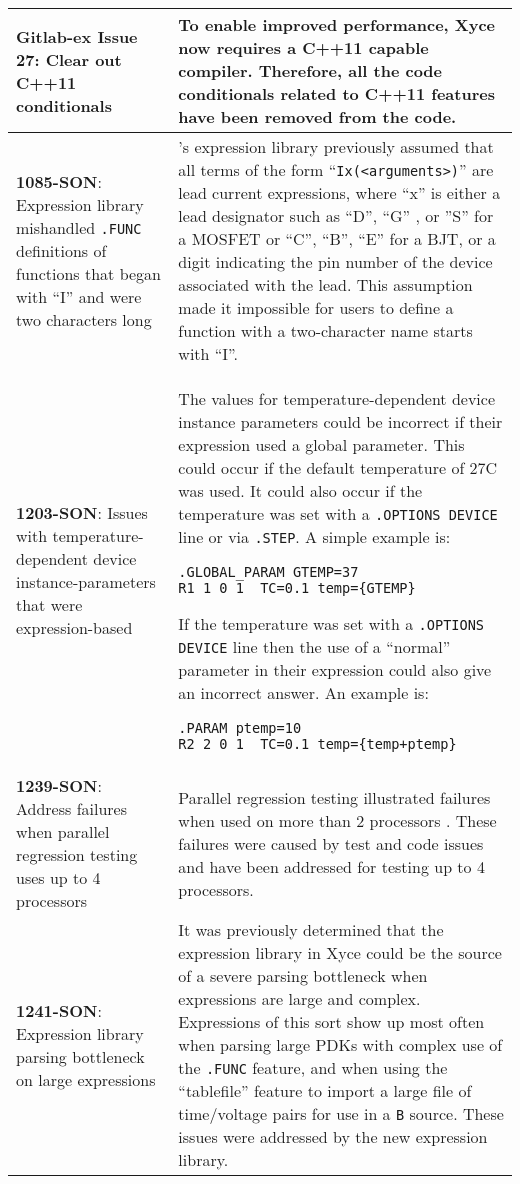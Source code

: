 {\begin{longtable}[h] {>{\raggedright\small}m{2in}|>{\raggedright\let\\\tabularnewline\small}m{3.5in}}
\textbf{Gitlab-ex Issue 27}:  Clear out C++11 conditionals&
To enable improved performance, Xyce now requires a C++11 capable
compiler.  Therefore, all the code conditionals related to C++11
features have been removed from the code.
\\ \hline

\textbf{1085-SON}: Expression library mishandled \texttt{.FUNC}
definitions of functions that began with ``I'' and were two characters
long &
\Xyce{}'s expression library previously assumed that all terms of the form
``\texttt{Ix(<arguments>)}'' are lead current expressions, where ``x'' is
either a lead designator such as ``D'', ``G'' , or ''S'' for a MOSFET
or ``C'', ``B'', ``E'' for a BJT, or a digit indicating the pin number
of the device associated with the lead.  This assumption made it
impossible for users to define a function with a two-character name
starts with ``I''.
\\ \hline

\textbf{1203-SON}: Issues with temperature-dependent device
instance-parameters that were expression-based & The values for
temperature-dependent device instance parameters could be incorrect
if their expression used a global parameter. This could occur if the
default temperature of 27C was used.  It could also occur if the
temperature was set with a \texttt{.OPTIONS DEVICE} line or via
\texttt{.STEP}.  A simple example is:
\begin{verbatim}
.GLOBAL_PARAM GTEMP=37
R1 1 0 1  TC=0.1 temp={GTEMP}
\end{verbatim}
If the temperature was set with a \texttt{.OPTIONS DEVICE} line then
the use of a ``normal'' parameter in their expression could also give
an incorrect answer.  An example is:
\begin{verbatim}
.PARAM ptemp=10
R2 2 0 1  TC=0.1 temp={temp+ptemp}
\end{verbatim}
\\ \hline

\textbf{1239-SON}: Address failures when parallel regression testing uses up to 4 processors &
Parallel regression testing illustrated failures when used on more
than 2 processors . These failures were caused by test and code issues
and have been addressed for testing up to 4 processors.
\\ \hline

\textbf{1241-SON}: Expression library parsing bottleneck on large expressions &
It was previously determined that the expression library in Xyce could
be the source of a severe parsing bottleneck when expressions are
large and complex.  Expressions of this sort show up most often when
parsing large PDKs with complex use of the \texttt{.FUNC} feature, and
when using the ``tablefile'' feature to import a large file of
time/voltage pairs for use in a \texttt{B} source.  These issues were
addressed by the new expression library.
\\ \hline


\end{longtable}}
